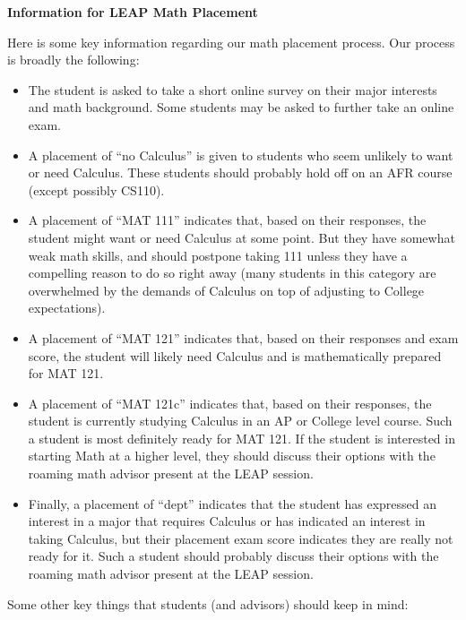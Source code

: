 \documentclass[12pt]{article}
\begin{document}
  \begin{center}
\Large{\textbf{Information for LEAP Math Placement}}
\end{center}
Here is some key information regarding our math placement process. Our process is broadly the following:
\begin{itemize}
\item The student is asked to take a short online survey on their major interests and math background. Some students may be asked to further take an online exam.
\item A placement of ``no Calculus'' is given to students who seem unlikely to want or need Calculus. These students should probably hold off on an AFR course (except possibly CS110).
\item A placement of ``MAT 111'' indicates that, based on their responses, the student might want or need Calculus at some point. But they have somewhat weak math skills, and should postpone taking 111 unless they have a compelling reason to do so right away (many students in this category are overwhelmed by the demands of Calculus on top of adjusting to College expectations).
\item A placement of ``MAT 121'' indicates that, based on their responses and exam score, the student will likely need Calculus and is mathematically prepared for MAT 121.
\item A placement of ``MAT 121c'' indicates that, based on their responses, the student is currently studying Calculus in an AP or College level course. Such a student is most definitely ready for MAT 121. If the student is interested in starting Math at a higher level, they should discuss their options with the roaming math advisor present at the LEAP session.
\item Finally, a placement of ``dept'' indicates that the student has expressed an interest in a major that requires Calculus or has indicated an interest in taking Calculus, but their placement exam score indicates they are really not ready for it. Such a student should probably discuss their options with the roaming math advisor present at the LEAP session.
\end{itemize}

\noindent Some other key things that students (and advisors) should keep in mind:
\end{document}
